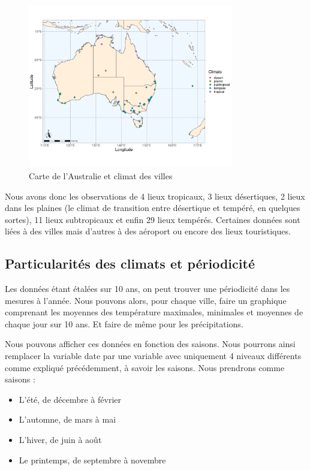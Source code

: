 \documentclass{article}
\begin{document}
\begin{figure}[H]
    \centering
    \includegraphics[width=0.8\textwidth]{Images/Cartographie/Australia_climates.png}
    \caption{Carte de l'Australie et climat des villes}
\end{figure}

Nous avons donc les observations de 4 lieux tropicaux, 3 lieux désertiques, 2 lieux dans les plaines (le climat de transition entre désertique et tempéré, en quelques sortes), 11 lieux subtropicaux et enfin 29 lieux tempérés. Certaines données sont liées à des villes mais d'autres à des aéroport ou encore des lieux touristiques.

\subsection{Particularités des climats et périodicité}

Les données étant étalées sur 10 ans, on peut trouver une périodicité dans les mesures à l'année. Nous pouvons alors, pour chaque ville, faire un graphique comprenant les moyennes des température maximales, minimales et moyennes de chaque jour sur 10 ans. Et faire de même pour les précipitations. 

Nous pouvons afficher ces données en fonction des saisons. Nous pourrons ainsi remplacer la variable date par une variable avec uniquement 4 niveaux différents comme expliqué précédemment, à savoir les saisons. Nous prendrons comme saisons : 

\begin{itemize}
    \item L’été, de décembre à février
    \item L’automne, de mars à mai
    \item L’hiver, de juin à août
    \item Le printemps, de septembre à novembre
\end{itemize}
\end{document}
